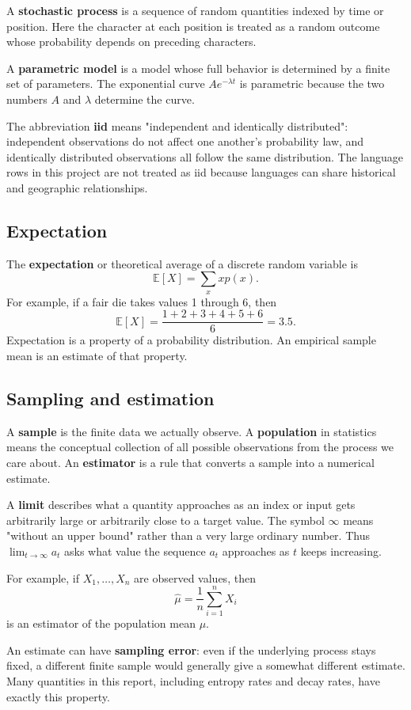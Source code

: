 \documentclass[11pt]{article}
\begin{document}
A \textbf{stochastic process} is a sequence of random quantities indexed by time or position. Here the character at each position is treated as a random outcome whose probability depends on preceding characters.

A \textbf{parametric model} is a model whose full behavior is determined by a finite set of parameters. The exponential curve $Ae^{-\lambda t}$ is parametric because the two numbers $A$ and $\lambda$ determine the curve.

The abbreviation \textbf{iid} means "independent and identically distributed": independent observations do not affect one another's probability law, and identically distributed observations all follow the same distribution. The language rows in this project are not treated as iid because languages can share historical and geographic relationships.

\subsection{Expectation}
The \textbf{expectation} or theoretical average of a discrete random variable is
\[
\mathbb E[X]=\sum_xxp(x).
\]
For example, if a fair die takes values 1 through 6, then
\[
\mathbb E[X]=\frac{1+2+3+4+5+6}{6}=3.5.
\]
Expectation is a property of a probability distribution. An empirical sample mean is an estimate of that property.

\subsection{Sampling and estimation}
A \textbf{sample} is the finite data we actually observe. A \textbf{population} in statistics means the conceptual collection of all possible observations from the process we care about. An \textbf{estimator} is a rule that converts a sample into a numerical estimate.

A \textbf{limit} describes what a quantity approaches as an index or input gets arbitrarily large or arbitrarily close to a target value. The symbol $\infty$ means "without an upper bound" rather than a very large ordinary number. Thus $\lim_{t\to\infty}a_t$ asks what value the sequence $a_t$ approaches as $t$ keeps increasing.

For example, if $X_1,\ldots,X_n$ are observed values, then
\[
\hat\mu=\frac{1}{n}\sum_{i=1}^nX_i
\]
is an estimator of the population mean $\mu$.

An estimate can have \textbf{sampling error}: even if the underlying process stays fixed, a different finite sample would generally give a somewhat different estimate. Many quantities in this report, including entropy rates and decay rates, have exactly this property.
\end{document}
